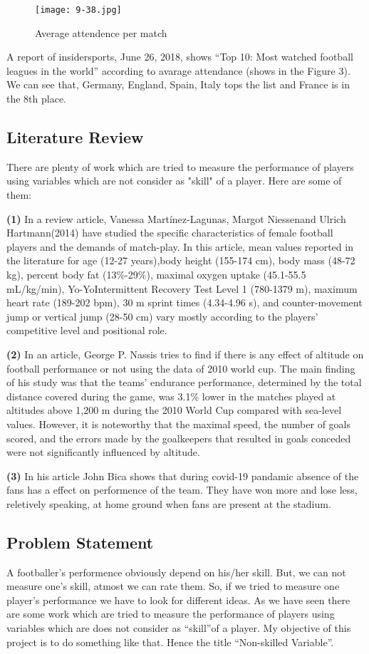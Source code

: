 \documentclass[12pt]{article}
\begin{document}
\begin{wrapfigure}{l}{7.5cm}
	\caption{Average attendence per match}\label{wrap-fig:1}
	\texttt{[image: 9-38.jpg]}
\end{wrapfigure}
 
A report of insidersports, June 26, 2018, shows “Top 10: Most watched football leagues in the world” according to avarage attendance (shows in the Figure 3). We can see that, Germany, England, Spain, Italy tops the list and France is in the 8th place. 
\subsection{Literature Review}
There are plenty of work which are tried to measure the performance of players using variables which are not consider as "skill" of a player. Here are some of them:

\textbf{ (1) } In a review article, Vanessa Martínez-Lagunas, Margot Niessenand Ulrich Hartmann(2014) have studied the specific characteristics of female football players and the demands of match-play. In this article, mean values reported in the literature for age (12-27 years),body height (155-174 cm), body mass (48-72 kg), percent body fat (13\%-29\%), maximal oxygen uptake (45.1-55.5 mL/kg/min), Yo-YoIntermittent Recovery Test Level 1 (780-1379 m), maximum heart rate (189-202 bpm), 30 m sprint times (4.34-4.96 s), and counter-movement jump or vertical jump (28-50 cm) vary mostly according to the players’ competitive level and positional role.
	 
\textbf{ (2)  } In an article, George P. Nassis tries to find if there is  any effect of altitude on football performance or not using the data of 2010 world cup. The main finding of his study was that the teams’ endurance performance, determined by the total distance covered during the game, was 3.1\% lower in the matches played at altitudes above 1,200 m during the 2010 World Cup compared with sea-level values. However, it is noteworthy that the maximal speed, the number of goals scored, and the errors made by the goalkeepers that resulted in goals conceded were not significantly influenced by altitude.
	 
\textbf{(3) } In his article John Bica shows that during covid-19 pandamic absence of the fans has a effect on performence of the team. They have won more and lose less, reletively speaking, at home ground when fans are present at the stadium.


\subsection{Problem Statement}
A footballer’s performence obviously depend on his/her skill. But, we can not measure one’s skill, atmost we can rate them. So, if we tried to measure one player’s performance we have to look for different ideas. As we have seen there are some work which are tried to measure the performance of players using variables which are does not consider as \textquotedblleft skill\textquotedblright of a player. My objective of this project is to do something like that. Hence the title “Non-skilled Variable”.
\end{document}
